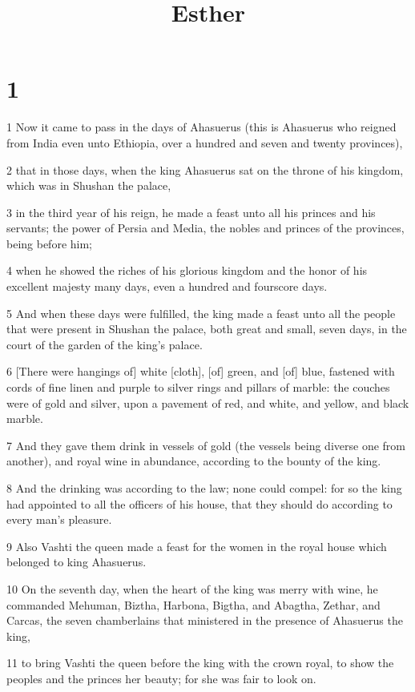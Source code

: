 

\title{Esther}

\chapter{1}

\par 1 Now it came to pass in the days of Ahasuerus (this is Ahasuerus who reigned from India even unto Ethiopia, over a hundred and seven and twenty provinces),
\par 2 that in those days, when the king Ahasuerus sat on the throne of his kingdom, which was in Shushan the palace,
\par 3 in the third year of his reign, he made a feast unto all his princes and his servants; the power of Persia and Media, the nobles and princes of the provinces, being before him;
\par 4 when he showed the riches of his glorious kingdom and the honor of his excellent majesty many days, even a hundred and fourscore days.
\par 5 And when these days were fulfilled, the king made a feast unto all the people that were present in Shushan the palace, both great and small, seven days, in the court of the garden of the king's palace.
\par 6 [There were hangings of] white [cloth], [of] green, and [of] blue, fastened with cords of fine linen and purple to silver rings and pillars of marble: the couches were of gold and silver, upon a pavement of red, and white, and yellow, and black marble.
\par 7 And they gave them drink in vessels of gold (the vessels being diverse one from another), and royal wine in abundance, according to the bounty of the king.
\par 8 And the drinking was according to the law; none could compel: for so the king had appointed to all the officers of his house, that they should do according to every man's pleasure.
\par 9 Also Vashti the queen made a feast for the women in the royal house which belonged to king Ahasuerus.
\par 10 On the seventh day, when the heart of the king was merry with wine, he commanded Mehuman, Biztha, Harbona, Bigtha, and Abagtha, Zethar, and Carcas, the seven chamberlains that ministered in the presence of Ahasuerus the king,
\par 11 to bring Vashti the queen before the king with the crown royal, to show the peoples and the princes her beauty; for she was fair to look on.

